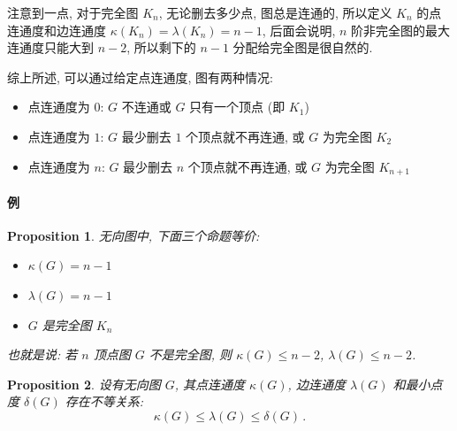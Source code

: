 \documentclass[UTF8]{ctexart}
\theoremstyle{mystyle}
\newtheorem{proposition}{Proposition}[section]
\theoremstyle{myremark}
\theoremstyle{plain}
\begin{document}
注意到一点, 对于完全图 $ K_n $, 无论删去多少点, 图总是连通的, 所以定义 $ K_n $ 的点连通度和边连通度 $ \kappa(K_n) = \lambda(K_n) = n - 1 $, 后面会说明, $ n $ 阶非完全图的最大连通度只能大到 $ n - 2 $, 所以剩下的 $ n - 1 $ 分配给完全图是很自然的.

综上所述, 可以通过给定点连通度, 图有两种情况:
\begin{itemize}
    \item 点连通度为 $ 0 $: $ G $ 不连通或 $ G $ 只有一个顶点 (即 $ K_1 $)
    \item 点连通度为 $ 1 $: $ G $ 最少删去 $ 1 $ 个顶点就不再连通, 或 $ G $ 为完全图 $ K_2 $
    \item 点连通度为 $ n $: $ G $ 最少删去 $ n $ 个顶点就不再连通, 或 $ G $ 为完全图 $ K_{n + 1} $
\end{itemize}

\paragraph{例}



\begin{proposition}
    无向图中, 下面三个命题等价:
    \begin{itemize}
        \item $ \kappa(G) = n - 1 $
        \item $ \lambda(G) = n - 1 $
        \item $ G $ 是完全图 $ K_n $
    \end{itemize}
    也就是说: 若 $ n $ 顶点图 $ G $ 不是完全图, 则 $ \kappa(G) \leqslant n - 2 $, $ \lambda(G) \leqslant n - 2 $.
\end{proposition}

\begin{proposition}
    设有无向图 $ G $, 其点连通度 $ \kappa(G) $, 边连通度 $ \lambda(G) $ 和最小点度 $ \delta(G) $ 存在不等关系:
    \[ \kappa(G) \leqslant \lambda(G) \leqslant \delta(G) \,.\]
\end{proposition}
\end{document}
